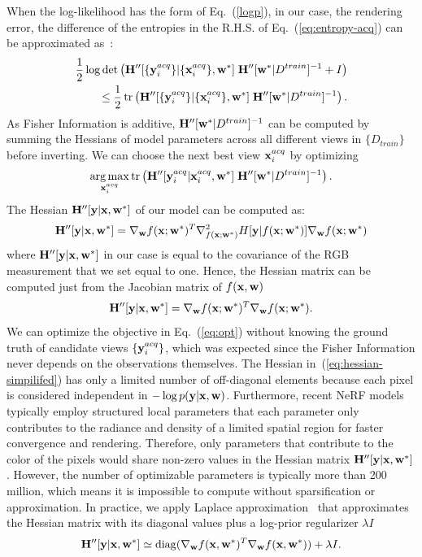 When the log-likelihood has the form of Eq.~(\ref{logp}), in our case, the rendering error, the difference of the entropies in the R.H.S. of Eq.~(\ref{eq:entropy-acq}) can be approximated as~\cite{kirsch2022unifying}: 
\begin{align}\label{eq:entropy-log}
 \frac{1}{2} \log \det \left({\mathbf H}''[\{{\bf y}^{acq}_i\}|\{{\bf x}^{acq}_i\}, {\bf w}^*]\; {\mathbf H}''[{\bf w}^*| D^{train}]^{-1} + I \right) \nonumber\\
    \leq \frac{1}{2}  \operatorname{tr}\left( {\mathbf H}''[\{{\bf y}^{acq}_i\}|\{{\bf x}^{acq}_i\}, {\bf w}^*]\; {\mathbf H}''[{\bf w}^*| D^{train}]^{-1}\right).
\end{align}
As Fisher Information is additive, ${\mathbf H}''[{\bf w}^*| D^{train}]^{-1}$ can be computed by summing the Hessians of model parameters across all different views in $\{D_{train}\}$ before inverting. We can choose the next best view ${\bf x}^{acq}_i$ by optimizing
\begin{equation}\label{eq:opt}
    \operatorname*{arg\,max}_{{\bf x}^{acq}_i} \operatorname{tr}\left( {\mathbf H}''[{\bf y}^{acq}_i | {\bf x}^{acq}_i, {\bf w}^*] \; {\mathbf H}''[{\bf w}^*| D^{train}]^{-1}\right).
\end{equation}
The Hessian ${\mathbf H}''[{\bf y}|{\bf x}, {\bf w}^*]$ of our model can be computed as:
\begin{equation}\label{eq:hessian-full}
    {\mathbf H}''[{\bf y}|{\bf x}, {\bf w}^*] = \nabla_{\bf w} f({\bf x}; {\bf w}^*) ^T \nabla_{f({\bf x};{\bf w}^*)}^2 H[{\bf y}| f({\bf x};{\bf w}^*)] \nabla_{\bf w} f({\bf x}; {\bf w}^*)
\end{equation}
where ${\mathbf H}''[{\bf y}| {\bf x},{\bf w}^*]$ in our case is equal to the covariance of the RGB measurement that we set equal to one.
Hence, the Hessian matrix can be computed just from the Jacobian matrix of $f({\bf x}, {\bf w})$
\begin{equation}\label{eq:hessian-simpilifed}
    {\mathbf H}''[{\bf y}|{\bf x}, {\bf w}^*] = \nabla_{\bf w} f({\bf x}; {\bf w}^*) ^T \nabla_{\bf w} f({\bf x}; {\bf w}^*).
\end{equation}
We can optimize the objective in Eq.~(\ref{eq:opt}) without knowing the ground truth of candidate views $\{{\bf y}^{acq}_i\}$, which was expected since the Fisher Information never depends on the observations themselves.
The Hessian in~(\ref{eq:hessian-simpilifed})
has only a limited number of off-diagonal elements because each pixel is considered independent in $- \log p({\bf y}|{\bf x}, {\bf w})$.
Furthermore, recent NeRF models~\cite{plenoxels,mueller2022instant, reiser2021kilonerf,sun2021direct} typically employ structured local parameters that each parameter only contributes to the radiance and density of a limited spatial region for faster convergence and rendering. Therefore, only parameters that contribute to the color of the pixels would share non-zero values in the Hessian matrix $ {\mathbf H}''[{\bf y}|{\bf x}, {\bf w}^*]$. 
However, the number of optimizable parameters is typically more than 200 million, which means it is impossible to compute without sparsification or approximation. 
In practice, we apply Laplace approximation~\cite{laplace2021, bayesian-interpolation} that approximates the Hessian matrix with its diagonal values plus a log-prior regularizer $\lambda I$
\begin{equation}\label{eq:hessian-reg}
    {\mathbf H}''[{\bf y}|{\bf x}, {\bf w}^*] \simeq \operatorname{diag}(\nabla_{\bf w} f({\bf x}, {\bf w}^*) ^T \nabla_{\bf w} f({\bf x}, {\bf w}^*)) + \lambda I.
\end{equation}
